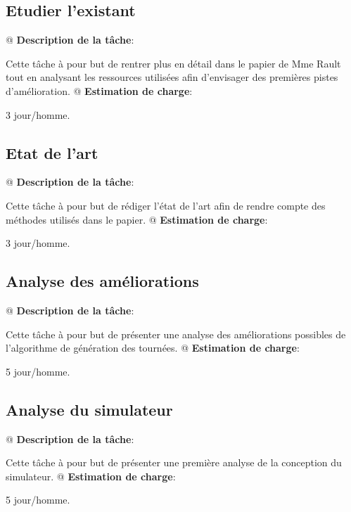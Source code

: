 \documentclass[final]{polytech/polytech}
\begin{document}
		\subsection{Etudier l’existant}
			\begin{easylist}
				@ \textbf{Description de la tâche}:
				
				Cette tâche à pour but de rentrer plus en détail dans le papier de Mme Rault tout en analysant les ressources utilisées afin d'envisager des premières pistes d'amélioration.
				@ \textbf{Estimation de charge}:
				
				3 jour/homme.
			\end{easylist}
			
		\subsection{Etat de l'art}
			\begin{easylist}
				@ \textbf{Description de la tâche}:
				
				Cette tâche à pour but de rédiger l'état de l'art afin de rendre compte des méthodes utilisés dans le papier.
				@ \textbf{Estimation de charge}:
				
				3 jour/homme.
			\end{easylist}
			
		\subsection{Analyse des améliorations}
			\begin{easylist}
				@ \textbf{Description de la tâche}:
				
				Cette tâche à pour but de présenter une analyse des améliorations possibles de l'algorithme de génération des tournées.
				@ \textbf{Estimation de charge}:
				
				5 jour/homme.
			\end{easylist}
			
		\subsection{Analyse du simulateur}
			\begin{easylist}
				@ \textbf{Description de la tâche}:
				
				Cette tâche à pour but de présenter une première analyse de la conception du simulateur.
				@ \textbf{Estimation de charge}:
				
				5 jour/homme.
			\end{easylist}
			
\end{document}
